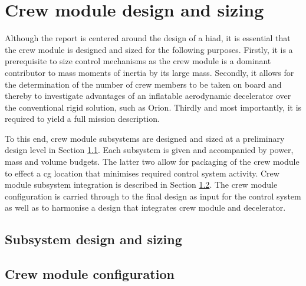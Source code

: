 \section{Crew module design and sizing}\label{ch:crewmod}
Although the report is centered around the design of a \acrfull{hiad}, it is essential that the crew module is designed and sized for the following purposes. Firstly, it is a prerequisite to size control mechanisms as the crew module is a dominant contributor to mass moments of inertia by its large mass. Secondly, it allows for the determination of the number of crew members to be taken on board and thereby to investigate advantages of an inflatable aerodynamic decelerator over the conventional rigid solution, such as Orion. Thirdly and most importantly, it is required to yield a full mission description.

To this end, crew module subsystems are designed and sized at a preliminary design level in Section \ref{sec:crewsubsys}. Each subsystem is given and accompanied by power, mass and volume budgets. The latter two allow for packaging of the crew module to effect a \gls{cg} location that minimises required control system activity. Crew module subsystem integration is described in Section \ref{sec:crewpackaging}. The crew module configuration is carried through to the final design as input for the control system as well as to harmonise a design that integrates crew module and decelerator.

\subsection{Subsystem design and sizing} \label{sec:crewsubsys}


\subsection{Crew module configuration} \label{sec:crewpackaging}


